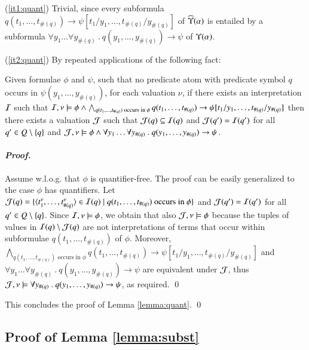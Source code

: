 (\ref{it1:quant}) Trivial, since every subformula
$q(t_1,\ldots,t_{\#(q)}) \rightarrow
\psi[t_1/y_1,\ldots,t_{\#(q)}/y_{\#(q)}]$ of $\widehat{\Upsilon}({\alpha})$ is
entailed by a subformula $\forall y_1 \ldots \forall y_{\#(q)} ~.~
q(y_1, \ldots, y_{\#(q)}) \rightarrow \psi$ of $\Upsilon({\alpha})$.

\noindent(\ref{it2:quant}) By repeated applications of the following
fact:

\begin{fact}
  Given formulae $\phi$ and $\psi$, such that no predicate atom with
  predicate symbol $q$ occurs in $\psi(y_1,\ldots,y_{\#(q)})$, for
  each valuation $\nu$, if there exists an interpretation $\mathcal{I}$ such
  that $\mathcal{I},\nu \models \phi \wedge \bigwedge_{q(t_1,\ldots,t_{\#(q)})
    \text{ occurs in } \phi} q(t_1,\ldots,t_{\#(q)}) \rightarrow
  \psi[t_1/y_1,\ldots,t_{\#(q)}/y_{\#(q)}]$ then there exists a
  valuation $\mathcal{J}$ such that $\mathcal{J}(q) \subseteq \mathcal{I}(q)$ and $\mathcal{J}(q') =
  \mathcal{I}(q')$ for all $q' \in Q \setminus \{ q \}$ and $\mathcal{J},\nu \models
  \phi \wedge \forall y_1 \ldots \forall y_{\#(q)} ~.~
  q(y_1,\ldots,y_{\#(q)}) \rightarrow \psi$.
\end{fact}
\paragraph{\em Proof.}
Assume w.l.o.g. that $\phi$ is quantifier-free. The proof can be
easily generalized to the case $\phi$ has quantifiers. Let $\mathcal{J}(q) =
\{ \langle t_1^\nu, \ldots, t_{\#(q)}^\nu \rangle \in \mathcal{I}(q) \mid
  q(t_1,\ldots,t_{\#(q)}) \text{ occurs in } \phi \}$ and $\mathcal{J}(q') =
\mathcal{I}(q')$ for all $q' \in Q \setminus \{ q \}$. Since $\mathcal{I},\nu \models
\phi$, we obtain that also $\mathcal{J},\nu \models \phi$ because the tuples of
values in $\mathcal{I}(q) \setminus \mathcal{J}(q)$ are not interpretations of terms
that occur within subformulae $q(t_1,\ldots,t_{\#(q)})$ of
$\phi$. Moreover, $\bigwedge_{q(t_1,\ldots,t_{\#(q)}) \text{ occurs in
  } \phi} q(t_1,\ldots,t_{\#(q)}) \rightarrow
\psi[t_1/y_1,\ldots,t_{\#(q)}/y_{\#(q)}]$ and $\forall y_1 \ldots
\forall y_{\#(q)} ~.~ q(y_1,\ldots,y_{\#(q)}) \rightarrow \psi$ are
equivalent under $\mathcal{J}$, thus $\mathcal{J},\nu \models \forall y_{\#(q)} ~.~
q(y_1,\ldots,y_{\#(q)}) \rightarrow \psi$, as required. \qed

\noindent This concludes the proof of Lemma \ref{lemma:quant}. \qed

\subsection{Proof of Lemma \ref{lemma:subst}}

